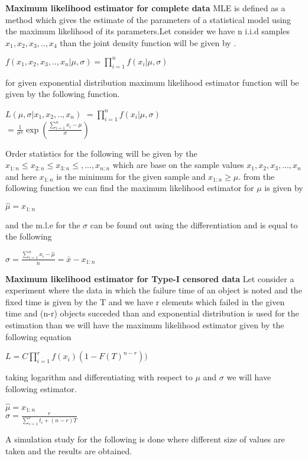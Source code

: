 \documentclass[12pt]{article}
\begin{document}
\textbf{Maximum likelihood estimator for complete data}
MLE is defined as a method which gives the estimate of the parameters of a statistical model using the maximum likelihood of its parameters.Let consider we have n i.i.d samples$x_{1},x_{2},x_{3},..,x_{4}$ than the joint density function will be given by .\\
\begin{center}
$f(x_{1},x_{2},x_{3},..,x_{n}|\mu,\sigma)=\prod_{i=1}^{n} f(x_{i}|\mu,\sigma)$\\
\end{center}
for given exponential distribution maximum likelihood estimator function will be given by the following function.\\
	\begin{center}
	$L(\mu,\sigma|x_{1},x_{2},..,x_{n})$
	$=\prod_{i=1}^{n} f(x_{i}|\mu,\sigma)$\\
	$=\frac{1}{\sigma^n} \exp(\frac{\sum_{i=1}^{n} x_{i}-\mu}{\sigma})$  
	\end{center}
 Order statistics for the following will be given by the \\
 $x_{1:n}\leq x_{2:n} \leq x_{3:n} \leq,...,x_{n:n}$ which are base on the sample values $x_{1},x_{2},x_{3},...,x_{n}$ and here $x_{1:n}$ is the minimum for the given sample and $x_{1:n}\geq \mu$.
 from the following function we can find the maximum likelihood estimator for $\mu$ is given by\\
 \begin{center}
 	$\hat \mu=x_{1:n}$
 \end{center}
 and the m.l.e for the $\sigma$ can be found out using the differentiation and is equal to the following
 \begin{center}
 	$\hat \sigma=\frac{\sum_{i=1}^{n} x_{i}-\hat \mu}{n}=\bar{x} -x_{1:n}$
 \end{center}
 
 \textbf{Maximum likelihood estimator for Type-I censored data}
 Let consider a experiment where the data in which the failure time of an object is noted and the fixed time is given by the T and we have r elements which failed in the given time and (n-r) objects succeded  than and exponential distribution is used for the estimation than we will have the maximum likelihood estimator given by the following equation\\
 \begin{center}
 $L=C \prod_{i=1}^{r} f(x_{i}) (1-F(T)^{n-r}) )$
 \begin{flushleft}
 	taking logarithm and differentiating with respect to $\mu$ and $\sigma$ we will have following estimator.\\
 \end{flushleft}
 $\hat \mu=x_{1:n}$\\
 $\hat \sigma=\frac{r}{\sum_{i=1}^{r} t_{i} +(n-r)T}$
 \end{center}
 A simulation study for the following is done where different size of values are taken and the results are obtained.
 
\end{document}
